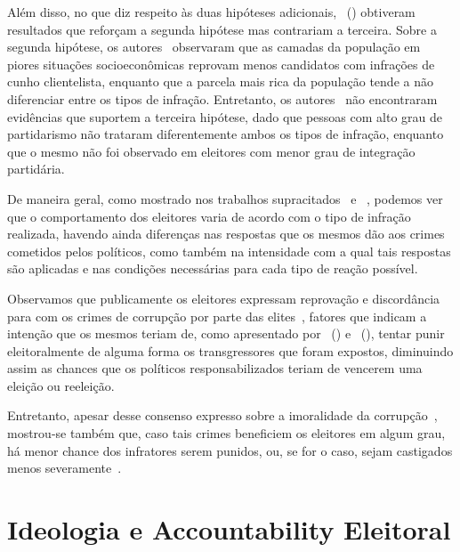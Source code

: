 \documentclass[
	12pt,				%
	openright,			%
	twoside,			%
	a4paper,			%
	openany,
	english,			%
	brazil				%
	]{abntex2}
\begin{document}
Além disso, no que diz respeito às duas hipóteses adicionais, ~(\citeyear{Botero2021Apr}) obtiveram resultados que reforçam a segunda hipótese mas contrariam a terceira. Sobre a segunda hipótese, os autores~\cite{Botero2021Apr} observaram que as camadas da população em piores situações socioeconômicas reprovam menos candidatos com infrações de cunho clientelista, enquanto que a parcela mais rica da população tende a não diferenciar entre os tipos de infração. Entretanto, os autores~\cite{Botero2021Apr} não encontraram evidências que suportem a terceira hipótese, dado que pessoas com alto grau de partidarismo não trataram diferentemente ambos os tipos de infração, enquanto que o mesmo não foi observado em eleitores com menor grau de integração partidária. %




De maneira geral, como mostrado nos trabalhos supracitados~\cite{Boas2019Apr} e ~\cite{Botero2021Apr}, podemos ver que o comportamento dos eleitores varia de acordo com o tipo de infração realizada, havendo ainda diferenças nas respostas que os mesmos dão aos crimes cometidos pelos políticos, como também na intensidade com a qual tais respostas são aplicadas e nas condições necessárias para cada tipo de reação possível.

Observamos que publicamente os eleitores expressam reprovação e discordância para com os crimes de corrupção por parte das elites~\cite{Boas2019Apr}, fatores que indicam a intenção que os mesmos teriam de, como apresentado por ~(\citeyear{ferraz2008exposing}) e ~(\citeyear{Avis2018Oct}), tentar punir eleitoralmente de alguma forma os transgressores que foram expostos, diminuindo assim as chances que os políticos responsabilizados teriam de vencerem uma eleição ou reeleição.

Entretanto, apesar desse consenso expresso sobre a imoralidade da corrupção~\cite{Boas2019Apr}, mostrou-se também que, caso tais crimes beneficiem os eleitores em algum grau, há menor chance dos infratores serem punidos, ou, se for o caso, sejam castigados menos severamente~\cite{Botero2021Apr}. 

\section{Ideologia e Accountability Eleitoral}
\end{document}
